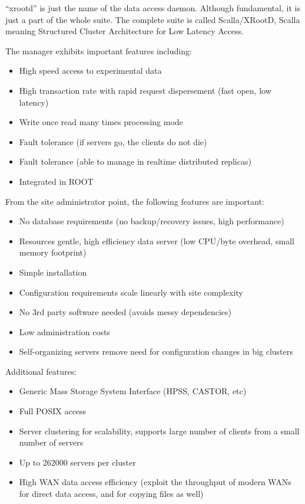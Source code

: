 \documentclass{intech}
\begin{document}
``xrootd'' is just the name of the data access daemon. Although
fundamental, it is just a part of the whole suite. The complete
suite is called Scalla/XRootD, Scalla meaning Structured Cluster
Architecture for Low Latency Access.

The manager exhibits important features including:
%
\begin{itemize}
\item High speed access to experimental data
\item High transaction rate with rapid request dispersement (fast
open, low latency)
\item Write once read many times processing mode
\item Fault tolerance (if servers go, the clients do not die)
\item Fault tolerance (able to manage in realtime distributed
replicas)
\item Integrated in ROOT
\end{itemize}

From the site administrator point, the following features are
important:
\begin{itemize}
\item  No database requirements (no backup/recovery issues, high
performance)
\item Resources gentle, high efficiency data server (low
CPU/byte overhead, small memory footprint)
\item  Simple installation
\item Configuration requirements scale linearly with site complexity
\item No 3rd party software needed (avoids messy dependencies)
\item Low administration costs
\item Self-organizing servers remove need for
configuration changes in big clusters
\end{itemize}

Additional features:
\begin{itemize}
\item Generic Mass Storage System Interface (HPSS, CASTOR, etc)
\item Full POSIX access
\item Server clustering for scalability, supports large number of
clients from a small number of servers
\item Up to 262000 servers per cluster
\item High WAN data access efficiency (exploit the throughput of
modern WANs for direct data access, and for copying files as well)
\end{itemize}
\end{document}
